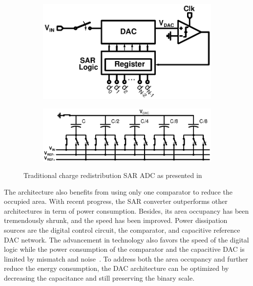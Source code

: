 \begin{figure}[htp]
	\centering
	\begin{subfigure}[b]{0.44\textwidth}
		\includegraphics[width=\textwidth]{Chapter3/Figs/sar_principle.ps}
		\label{fig:sar_principle}
	\end{subfigure}
	\begin{subfigure}[b]{0.52\textwidth}
		\includegraphics[width=\textwidth]{Chapter3/Figs/sar_classic_dac.ps}
		\label{fig:sar_dac_classical}
	\end{subfigure}
	\caption{Traditional charge redistribution SAR ADC as presented in~\cite{McCreary1975}}
	\label{fig:sar_adc}
\end{figure}

The architecture also benefits from using only one comparator to reduce the occupied area. With recent progress, the SAR converter outperforms other architectures in term of power consumption. Besides, its area occupancy has been tremendously shrunk, and the speed has been improved. Power dissipation sources are the digital control circuit, the comparator, and capacitive reference DAC network. The advancement in technology also favors the speed of the digital logic while the power consumption of the comparator and the capacitive DAC is limited by mismatch and noise~\cite{Yue2013,Mueller2013,Collins2017}. To address both the area occupancy and further reduce the energy consumption, the DAC architecture can be optimized by decreasing the capacitance and still preserving the binary scale.

